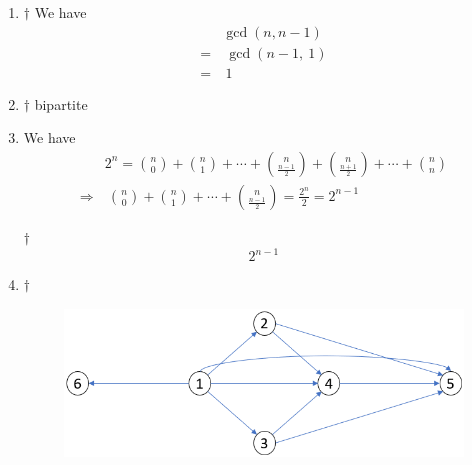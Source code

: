 \documentclass[a4paper,12pt]{article}
\begin{document}
\begin{enumerate}
    \item \begin{answer}{$\dag$} We have \begin{equation}
            \begin{aligned}
                & \gcd(n, n - 1) \\
                = & \ \gcd(n - 1, \ 1) \\
                = & \ 1
            \end{aligned}        
        \end{equation}
    \end{answer}
    \item \begin{answer}{$\dag$} bipartite
    \end{answer}
    \item We have \begin{equation}
        \begin{aligned}
            & 2^n = \binom{n}{0} + \binom{n}{1} + \cdots + \binom{n}{\frac{n - 1}{2}} + \binom{n}{\frac{n + 1}{2}} + \cdots + \binom{n}{n} \\
            \Rightarrow & \ \binom{n}{0} + \binom{n}{1} + \cdots + \binom{n}{\frac{n - 1}{2}} = \frac{2^n}{2} = 2^{n - 1}
        \end{aligned}
    \end{equation}
    \begin{answer}{$\dag$}\begin{equation}
            2^{n - 1}      
        \end{equation}
    \end{answer}
    \item \begin{answer}{$\dag$}\quad\begin{figure}[H]
            \centering
            \includegraphics[scale=0.8]{img/ntu_106_math_12.png}
            \label{img:ntu_106_math_12}
        \end{figure}
    \end{answer}
\end{enumerate}

\end{document}
